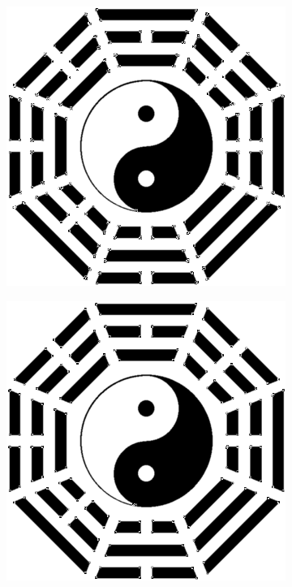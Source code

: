\documentclass[letterpaper, 10 pt, conference]{ieeeconf}  %
\begin{document}
\begin{figure}[htbp]
      \centering
    \begin{subfigure}[b]{0.49\linewidth}
      \includegraphics[width=\linewidth]{experiments/bagua_harris.png}
      \caption{}
    \end{subfigure}
    \begin{subfigure}[b]{0.49\linewidth}
      \includegraphics[width=\linewidth]{experiments/bagua_ECSS.png}

\end{subfigure}
\end{figure}
\end{document}

